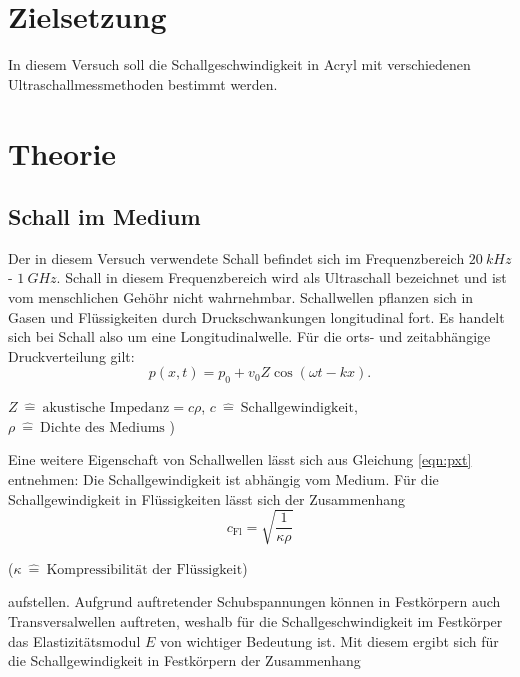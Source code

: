 \section{Zielsetzung}
\label{sec:Zielsetzung}

In diesem Versuch soll die Schallgeschwindigkeit in Acryl mit verschiedenen Ultraschallmessmethoden
bestimmt werden.

\section{Theorie}
\label{sec:Theorie}

\subsection{Schall im Medium} \label{sec:SIM}
Der in diesem Versuch verwendete Schall befindet sich im Frequenzbereich $\SI{20}{kHz}$ - $\SI{1}{GHz}$.
Schall in diesem Frequenzbereich wird als Ultraschall bezeichnet und ist vom menschlichen Gehöhr nicht wahrnehmbar. \newline
Schallwellen pflanzen sich in Gasen und Flüssigkeiten durch Druckschwankungen longitudinal fort. Es handelt sich bei Schall also um eine Longitudinalwelle. Für
die orts- und zeitabhängige Druckverteilung gilt:
\begin{equation}
  p(x,t)=p_0+v_0 Z \cos(\omega t - kx) \text{.} \label{eqn:pxt}
\end{equation}
\begin{center}
 \tiny {$Z\: \hat{=} \:\text{akustische Impedanz}=c\rho $, $c\: \hat{=} \: \text{Schallgewindigkeit}$, $\rho\: \hat{=} \: \text{Dichte des Mediums}$ )}
\end{center}
Eine weitere Eigenschaft von Schallwellen lässt sich aus Gleichung \eqref{eqn:pxt} entnehmen: Die Schallgewindigkeit ist abhängig vom Medium.
Für die Schallgewindigkeit in Flüssigkeiten lässt sich der Zusammenhang
\begin{equation}
c_\text{{Fl}}=\sqrt{\frac{1}{\kappa\rho}}\label{eq:Fl}
\end{equation}
\begin{center}
 \tiny {($\kappa \: \hat{=} \:\text{Kompressibilität der Flüssigkeit}$)}
\end{center}
aufstellen.
Aufgrund auftretender Schubspannungen können in Festkörpern auch Transversalwellen auftreten, weshalb für die Schallgeschwindigkeit im Festkörper das Elastizitätsmodul $E$ von wichtiger Bedeutung ist.
Mit diesem ergibt sich für die Schallgewindigkeit in Festkörpern der Zusammenhang
